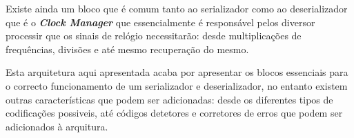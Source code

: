 Existe ainda um bloco que é comum tanto ao serializador como ao deserializador que é o \textbf{\textit{Clock Manager}} que essencialmente é responsável pelos diversor processir que os sinais de relógio necessitarão: desde multiplicações de frequências, divisões e até mesmo recuperação do mesmo.

Esta arquitetura aqui apresentada acaba por apresentar os blocos essenciais para o correcto funcionamento de um serializador e deserializador, no entanto existem outras características que podem ser adicionadas: desde os diferentes tipos de codificações possiveis, até códigos detetores e corretores de erros que podem ser adicionados à arquitura.




